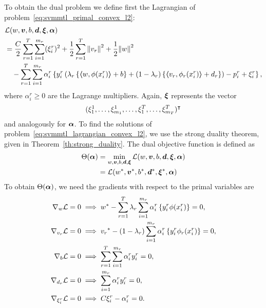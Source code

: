  To obtain the dual problem we define first the Lagrangian of problem~\eqref{eq:svmmtl_primal_convex_l2}:
\begin{equation}\label{eq:svmmtl_lagrangian_convex_l2}
    \begin{aligned}
        & \lagr({w}, \fv{v}, b, \fv{d}, \fv{\xi}, \fv{\alpha}) \\
        &=  \frac{C}{2} \sum_{r= 1}^T \sum_{i=1}^{m_r} ({\xi_{i}^r})^2 + \frac{1}{2} \sum_{r= 1}^T{\norm{{v}_r}^2} + \frac{1}{2} {\norm{{w}}}^2 \\
        &\quad -  \sum_{r= 1}^T \sum_{i=1}^{m_r} \alpha_i^r \left\lbrace y_{i}^r  \left(\lambda_r \left\lbrace \dotp{w}{\phi(x_{i}^r)} + b  \right\rbrace + (1 - \lambda_r) \left\lbrace \dotp{{v}_r}{\phi_r(x_{i}^r)} + d_r \right\rbrace  \right) - p_{i}^r + \xi_{i}^r  \right\rbrace ,
    \end{aligned}
\end{equation}
where $\alpha_i^r \geq 0$ are the Lagrange multipliers. 
Again, $\bm{\xi}$ represents the vector $$(\xi_1^1, \ldots, \xi_{m_1}^1, \ldots, \xi_1^T, \ldots, \xi_{m_T}^T)^\intercal$$ and analogously for $\bm{\alpha}$. 
To find the solutions of problem~\eqref{eq:svmmtl_lagrangian_convex_l2}, we use the strong duality theorem, given in Theorem~\ref{th:strong_duality}. The dual objective function is defined as 
\begin{equation}\nonumber
    \begin{aligned}
         \Theta(\bm{\alpha}) &=  \min_{{w}, \bm{v}, b, \bm{d}, \bm{\xi}} \mathcal{L}({w}, \bm{v}, b, \bm{d}, \bm{\xi}, \bm{\alpha}) \\
         &= \mathcal{L}({{w}}^*, {\bm{v}}^*, {b}^*, {\bm{d}}^*, {\bm{\xi}}^*, \bm{\alpha})
    \end{aligned}    
\end{equation}
To obtain $\Theta(\bm{\alpha})$, we need the gradients with respect to the primal variables are
\begin{align}
    \grad_{{w}} \lagr = 0  &\implies \optim{{w}} - \sum_{r= 1}^\ntasks \lambda_r \sum_{i=1}^{m_r} {\alpha_i^r} \left\lbrace y_i^r \phi(x_i^r) \right\rbrace = 0 , \label{eq:common_repr_conv_l2} \\
    \grad_{{v}_r} \lagr = 0 &\implies \optim{{v}_r} - (1 - \lambda_r) \sum_{i=1}^{m_r} {\alpha_i^r} \left\lbrace y_i^r \phi_r(x_i^r) \right\rbrace = 0 , \label{eq:specific_repr_conv_l2} \\
    \grad_{b} \lagr = 0  &\implies \sum_{r= 1}^T \sum_{i=1}^{m_r} {\alpha_i^r} y_i^r = 0 , \label{eq:specific_eqconstr_conv_l2}  \\
    \grad_{{d}_r} \lagr = 0 &\implies \sum_{i=1}^{m_r} {\alpha_i^r} y_i^r = 0 , \label{eq:common_eqconstr_conv_l2} \\
    \grad_{\xi_i^r} \lagr = 0 &\implies C \xi_i^r - {\alpha_i^r} = 0 . \label{eq:xi_feas_conv_l2}
\end{align}
